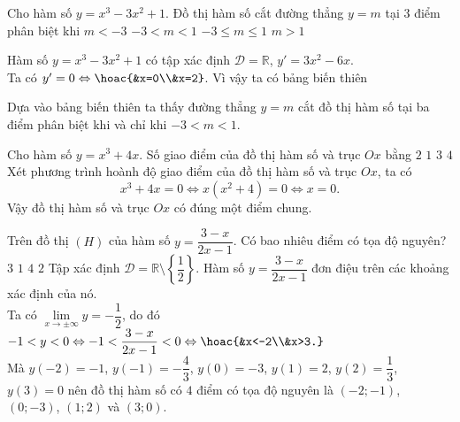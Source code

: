 \begin{ex}%
    Cho hàm số $y=x^3-3x^2+1$. Đồ thị hàm số cắt đường thẳng $y=m$ tại $3$ điểm phân biệt khi
    \choice
    {$m<-3$}
    {\True $-3<m<1$}
    {$-3\leq m\leq 1$}
    {$m>1$}
    \loigiai
    {Hàm số $y=x^3-3x^2+1$ có tập xác định $\mathscr{D}=\mathbb{R}$, $y'=3x^2-6x$.\\
    Ta có $y'=0\Leftrightarrow \hoac{&x=0\\&x=2}$. Vì vậy ta có bảng biến thiên
    \begin{center}
    \end{center}
    Dựa vào bảng biến thiên ta thấy đường thẳng $y=m$ cắt đồ thị hàm số tại ba điểm phân biệt khi và chỉ khi $-3<m<1$.}
\end{ex}

\begin{ex}%
    Cho hàm số $y=x^3+4x$. Số giao điểm của đồ thị hàm số và trục $Ox$ bằng
    \choice
    {$2$}
    {\True $1$}
    {$3$}
    {$4$}
    \loigiai
    {Xét phương trình hoành độ giao điểm của đồ thị hàm số và trục $Ox$, ta có
    \[x^3+4x=0 \Leftrightarrow x\left(x^2+4\right)=0 \Leftrightarrow x=0.\]
    Vậy đồ thị hàm số và trục $Ox$ có đúng một điểm chung.}
\end{ex}

\begin{ex}%
    Trên đồ thị $(H)$ của hàm số $y=\dfrac{3-x}{2x-1}$. Có bao nhiêu điểm có tọa độ nguyên?
    \choice
    {$3$}
    {$1$}
    {\True $4$}
    {$2$}
    \loigiai
    {Tập xác định $\mathscr{D}=\mathbb{R}\setminus\left\{\dfrac{1}{2}\right\}$. Hàm số $y=\dfrac{3-x}{2x-1}$ đơn điệu trên các khoảng xác định của nó.\\
    Ta có $\lim\limits_{x\to \pm \infty}y=-\dfrac{1}{2}$, do đó
    $-1<y<0 \Leftrightarrow -1<\dfrac{3-x}{2x-1}<0 \Leftrightarrow \hoac{&x<-2\\&x>3.}$\\
    Mà $y(-2)=-1$, $y(-1)=-\dfrac{4}{3}$, $y(0)=-3$, $y(1)=2$, $y(2)=\dfrac{1}{3}$, $y(3)=0$ nên đồ thị hàm số có $4$ điểm có tọa độ nguyên là $(-2;-1)$, $(0;-3)$, $(1;2)$ và $(3;0)$.}
\end{ex}

